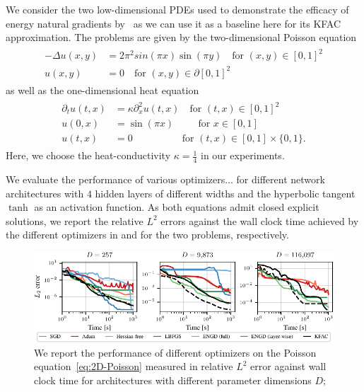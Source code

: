We consider the two low-dimensional PDEs used to demonstrate the efficacy of energy natural gradients by~\cite{muller2023achieving}
as we can use it as a baseline here for its KFAC approximation. 
The problems are given by the two-dimensional Poisson equation 
\begin{align}\label{eq:2D-Poisson}
    \begin{split}
        -\Delta u(x,y) & = 2\pi^2 sin(\pi x) \sin(\pi y) \quad \text{for } (x,y)\in[0,1]^2 \\ 
    u(x,y) & = 0 \quad \text{for } (x,y) \in\partial[0,1]^2
    \end{split}
\end{align}
as well as the one-dimensional heat equation 
\begin{align}\label{eq:1D-Heat}
    \begin{split}
        \partial_t u(t,x) &= \kappa\partial_x^2u(t,x) \quad \text{for }(t,x)\in[0,1]^2
        \\
        u(0,x) &= \sin(\pi x) \qquad\;\, \text{for }x\in[0,1]
        \\
        u(t,x) &= 0 \qquad\qquad\quad\text{for }(t,x)\in[0,1]\times\{0,1\}.
    \end{split}
\end{align}
Here, we choose the heat-conductivity $\kappa = \frac14$ in our experiments. 

We evaluate the performance of various optimizers... for different network architectures with $4$ hidden layers of different widths and the hyperbolic tangent $\tanh$ as an activation function. 
As both equations admit closed explicit solutions, we report the relative $L^2$ errors against the wall clock time achieved by the different optimizers in  and  for the two problems, respectively. 

\begin{figure}
    \centering
    \includegraphics{../kfac_pinns_exp/exp17_groupplot_poisson2d/l2_error_over_time.pdf}
    \caption{We report the performance of different optimizers on the Poisson equation~\eqref{eq:2D-Poisson} measured in relative $L^2$ error against wall clock time for architectures with different parameter dimensions $D$; }
    \label{fig:2D-Poisson}
\end{figure}


